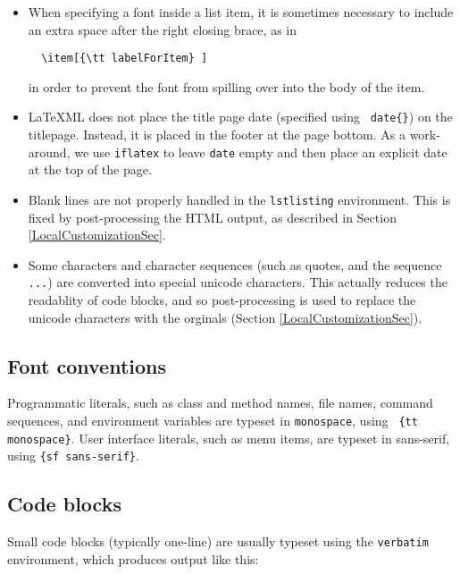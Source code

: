\documentclass{article}
\begin{document}
\begin{itemize}

\item When specifying a font inside a list item, it is sometimes
necessary to include an extra space after the right closing brace,
as in
\begin{verbatim}
  \item[{\tt labelForItem} ]
\end{verbatim}
in order to prevent the font from spilling over into the body
of the item.

\item LaTeXML does not place the title page date (specified using {\tt
\BKS date\{\}}) on the titlepage. Instead, it is placed in the
footer at the page bottom. As a work-around, we use {\tt \BKS iflatex} to
leave {\tt \BKS date} empty and then place an explicit date at the top of
the page.

\item Blank lines are not properly handled in the {\tt lstlisting}
environment. This is fixed by post-processing the HTML output, as
described in Section \ref{LocalCustomizationSec}.

\item Some characters and character sequences (such as quotes, and the
sequence {\tt ...}) are converted into special unicode characters.
This actually reduces the readablity of code blocks, and so
post-processing is used to replace the unicode characters with the
orginals (Section \ref{LocalCustomizationSec}).

\end{itemize}

\subsection{Font conventions}

Programmatic literals, such as class and method names, file names, 
command sequences, and
environment variables are typeset in {\tt monospace}, using {\tt
\{\BKS tt monospace\}}. User interface literals, such as menu items, are
typeset in {\sf sans-serif}, using {\tt \{\BKS sf sans-serif\}}.

\subsection{Code blocks}

Small code blocks (typically one-line) are usually typeset using the
{\tt verbatim} environment, which produces output like this:
\end{document}
